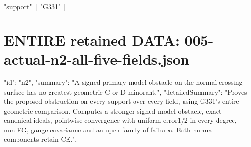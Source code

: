 \documentclass[11pt]{article}
\begin{document}
\begin{Full422Data}
{  "support": [
    "G331"
  ]
}

\end{Full422Data}
\section{ENTIRE retained DATA: 005-actual-n2-all-five-fields.json}
\begin{Full422Data}
{
  "id": "n2",
  "summary": "A signed primary-model obstacle on the normal-crossing surface has no greatest geometric C or D minorant.",
  "detailedSummary": "Proves the proposed obstruction on every support over every field, using G331's entire geometric comparison. Computes a stronger signed model obstacle, exact canonical ideals, pointwise convergence with uniform error1/2 in every degree, non-FG, gauge covariance and an open family of failures. Both normal components retain CE.",
}
\end{Full422Data}
\end{document}
